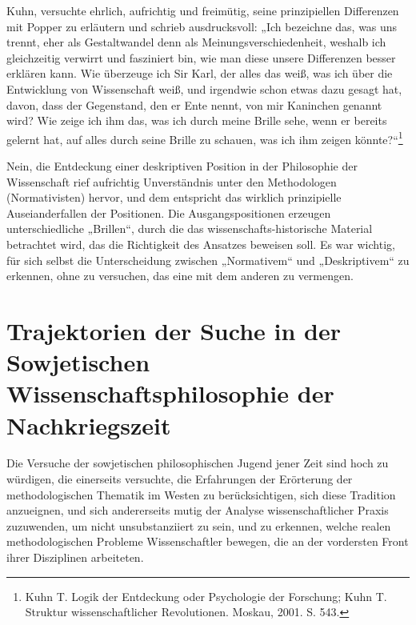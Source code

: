 \documentclass[11pt,a4paper]{article}
\begin{document}
Kuhn, versuchte ehrlich, aufrichtig und freimütig, seine prinzipiellen
Differenzen mit Popper zu erläutern und schrieb ausdrucksvoll: „Ich bezeichne
das, was uns trennt, eher als Gestaltwandel denn als Meinungsverschiedenheit,
weshalb ich gleichzeitig verwirrt und fasziniert bin, wie man diese unsere
Differenzen besser erklären kann.  Wie überzeuge ich Sir Karl, der alles das
weiß, was ich über die Entwicklung von Wissenschaft weiß, und irgendwie schon
etwas dazu gesagt hat, davon, dass der Gegenstand, den er Ente nennt, von mir
Kaninchen genannt wird? Wie zeige ich ihm das, was ich durch meine Brille
sehe, wenn er bereits gelernt hat, auf alles durch seine Brille zu schauen,
was ich ihm zeigen könnte?“\footnote{ Kuhn T. Logik der Entdeckung oder
  Psychologie der Forschung; Kuhn T. Struktur wissenschaftlicher Revolutionen.
  Moskau, 2001. S. 543.}

Nein, die Entdeckung einer deskriptiven Position in der Philosophie der
Wissenschaft rief aufrichtig Unverständnis unter den Methodologen
(Normativisten) hervor, und dem entspricht das wirklich prinzipielle
Auseianderfallen der Positionen. Die Ausgangspositionen erzeugen
unterschiedliche „Brillen“, durch die das wissenschafts-historische Material
betrachtet wird, das die Richtigkeit des Ansatzes beweisen soll. Es war
wichtig, für sich selbst die Unterscheidung zwischen „Normativem“ und
„Deskriptivem“ zu erkennen, ohne zu versuchen, das eine mit dem anderen zu
vermengen.

\section*{Trajektorien der Suche in der\\ Sowjetischen
  Wissenschaftsphilosophie der Nachkriegszeit}

Die Versuche der sowjetischen philosophischen Jugend jener Zeit sind hoch zu
würdigen, die einerseits versuchte, die Erfahrungen der Erörterung der
methodologischen Thematik im Westen zu berücksichtigen, sich diese Tradition
anzueignen, und sich andererseits mutig der Analyse wissenschaftlicher Praxis
zuzuwenden, um nicht unsubstanziiert zu sein, und zu erkennen, welche realen
methodologischen Probleme Wissenschaftler bewegen, die an der vordersten Front
ihrer Disziplinen arbeiteten.
\end{document}
